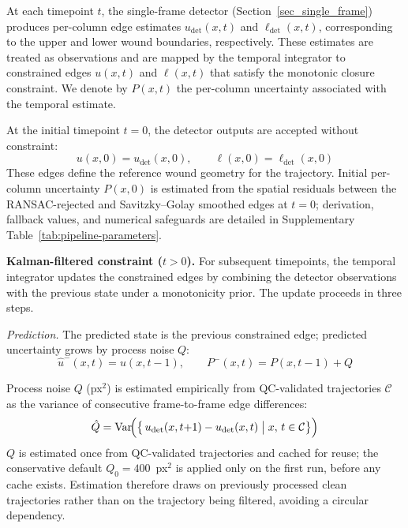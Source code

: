 At each timepoint $t$, the single-frame detector (Section~\ref{sec_single_frame}) produces per-column edge estimates $u_\text{det}(x,t)$ and $\ell_\text{det}(x,t)$, corresponding to the upper and lower wound boundaries, respectively. These estimates are treated as observations and are mapped by the temporal integrator to constrained edges $u(x,t)$ and $\ell(x,t)$ that satisfy the monotonic closure constraint. We denote by $P(x,t)$ the per-column uncertainty associated with the temporal estimate.

At the initial timepoint $t = 0$, the detector outputs are accepted without constraint:
\begin{equation}
	u(x,0) = u_\text{det}(x,0), \qquad \ell(x,0) = \ell_\text{det}(x,0)
\end{equation}
These edges define the reference wound geometry for the trajectory. Initial per-column uncertainty $P(x,0)$ is estimated from the spatial residuals between the RANSAC-rejected and Savitzky--Golay smoothed edges at $t = 0$; derivation, fallback values, and numerical safeguards are detailed in Supplementary Table~\ref{tab:pipeline-parameters}.

\textbf{Kalman-filtered constraint ($t > 0$).}
For subsequent timepoints, the temporal integrator updates the constrained edges by combining the detector observations with the previous state under a monotonicity prior. The update proceeds in three steps.

\emph{Prediction.}
The predicted state is the previous constrained edge; predicted uncertainty grows by process
noise $Q$:
\begin{equation}
	\hat{u}^-(x, t) = u(x, t-1), \qquad P^-(x, t) = P(x, t-1) + Q
	\label{eq:kalman-predict}
\end{equation}

Process noise $Q$ (px$^2$) is estimated empirically from QC-validated trajectories
$\mathcal{C}$ as the variance of consecutive frame-to-frame edge differences:
\begin{equation}
	\hat{Q} = \operatorname{Var}\!\Bigl(\bigl\{\,u_\text{det}(x,t{+}1) - u_\text{det}(x,t)\;\big|\; x,\,t \in \mathcal{C}\bigr\}\Bigr)
	\label{eq:Q-estimate}
\end{equation}
$Q$ is estimated once from QC-validated trajectories and cached for reuse; the
conservative default $Q_0 = 400$~px$^2$ is applied only on the first run, before any
cache exists. Estimation therefore draws on previously processed clean trajectories
rather than on the trajectory being filtered, avoiding a circular dependency.

